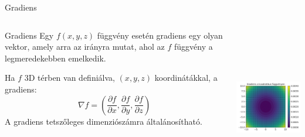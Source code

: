 \documentclass[english, aspectratio=169]{beamer}
\begin{document}
\begin{frame}{Gradiens}
\begin{columns}
\begin{column}{.5\textwidth}
\begin{block}{Gradiens}
Egy $f\left( x,y,z \right)$ függvény esetén gradiens egy olyan vektor, amely arra az irányra mutat, ahol az $f$ függvény a legmeredekebben emelkedik.\par\smallskip
Ha $f$ 3D térben van definiálva, $\left( x,y,z \right)$ koordinátákkal, a gradiens: 
\[
\nabla f = \left( \frac{\partial f}{\partial x}, \frac{\partial f}{\partial y}, \frac{\partial f}{\partial z} \right)
\]
A gradiens tetszőleges dimenziószámra általánosítható. 
\end{block}
\end{column}
\begin{column}{.5\textwidth}
\begin{center}
\includegraphics[width=7cm, height=7cm, keepaspectratio]{images/regresszio_17.png}
\end{center}
\end{column}
\end{columns}
\end{frame}
\end{document}

